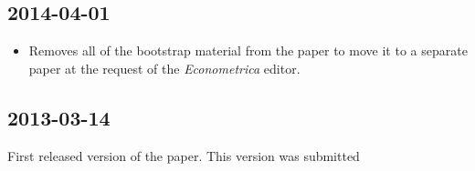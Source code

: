 \subsection{2014-04-01}
\begin{itemize}
\item Removes all of the bootstrap material from the paper to move it
to a separate paper at the request of the \textit{Econometrica}
editor.
\end{itemize}

\subsection{2013-03-14}
First released version of the paper. This version was submitted

